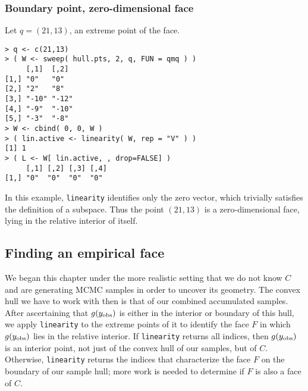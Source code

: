 \subsubsection{Boundary point, zero-dimensional face}
Let $q = (21,13)$, an extreme point of the face.
{ \singlespace
\begin{verbatim}
> q <- c(21,13)
> ( W <- sweep( hull.pts, 2, q, FUN = qmq ) )
     [,1]  [,2] 
[1,] "0"   "0"  
[2,] "2"   "8"  
[3,] "-10" "-12"
[4,] "-9"  "-10"
[5,] "-3"  "-8" 
> W <- cbind( 0, 0, W )
> ( lin.active <- linearity( W, rep = "V" ) )
[1] 1
> ( L <- W[ lin.active, , drop=FALSE] )
     [,1] [,2] [,3] [,4]
[1,] "0"  "0"  "0"  "0" 
\end{verbatim}
}
In this example, \texttt{linearity} identifies only the zero vector, which
trivially satisfies the definition of a subspace.  Thus the point $(21,13)$
is a zero-dimensional face, lying in the relative interior of itself.

\subsection{Finding an empirical face}
We began this chapter under the more realistic setting that we do not know
$C$ and are generating MCMC samples in order to uncover its geometry.  
The convex hull we have to work with then is that of our combined accumulated samples.
After ascertaining that $g(y_{\text{obs}})$ is either in the interior
or boundary of this hull, we apply \texttt{linearity} to the extreme points of it 
to identify the face $F$ in which $g(y_{\text{obs}})$ lies in the relative interior.  
If \texttt{linearity} returns all indices, then $g(y_{\text{obs}})$ is an interior point, not just
of the convex hull of our samples, but of $C$.  Otherwise, \texttt{linearity} returns 
the indices that characterize the face $F$ on the boundary of our sample hull; more work is 
needed to determine if $F$ is also a face of $C$.


